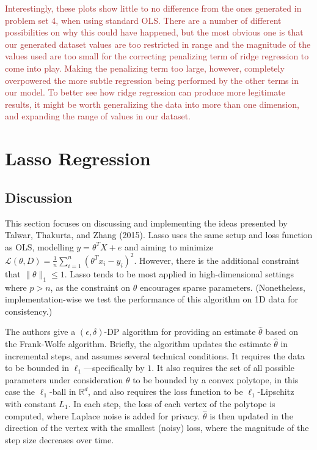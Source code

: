 \documentclass[11pt,conference]{IEEEtran}
\newcommand{\loss}{\mathcal{L}}
\begin{document}
\newpage
\textcolor{brown}{Interestingly, these plots show little to no difference from the ones generated in problem set 4, when using standard OLS. There are a number of different possibilities on why this could have happened, but the most obvious one is that our generated dataset values are too restricted in range and the magnitude of the values used are too small for the correcting penalizing term of ridge regression to come into play. Making the penalizing term too large, however, completely overpowered the more subtle regression being performed by the other terms in our model. To better see how ridge regression can produce more legitimate results, it might be worth generalizing the data into more than one dimension, and expanding the range of values in our dataset.}

\section{Lasso Regression}
\subsection{Discussion}
This section focuses on discussing and implementing the ideas presented by Talwar, Thakurta, and Zhang (2015). Lasso uses the same setup and loss function as OLS, modelling $y=\theta^T X+e$ and aiming to minimize $\loss(\theta, D)=\frac{1}{n}\sum_{i=1}^n (\theta^T x_i-y_i)^2$. However, there is the additional constraint that $\|\theta\|_1\leq 1$. Lasso tends to be most applied in high-dimensional settings where $p>n$, as the constraint on $\theta$ encourages sparse parameters. (Nonetheless, implementation-wise we test the performance of this algorithm on 1D data for consistency.)

The authors give a $(\epsilon,\delta)$-DP algorithm for providing an estimate $\hat{\theta}$ based on the Frank-Wolfe algorithm. Briefly, the algorithm updates the estimate $\hat{\theta}$ in incremental steps, and assumes several technical conditions. It requires the data to be bounded in $\ell_1$---specifically by $1$. It also requires the set of all possible parameters under consideration $\theta$ to be bounded by a convex polytope, in this case the $\ell_1$-ball in $\mathbb{R}^d$, and also requires the loss function to be $\ell_1$-Lipschitz with constant $L_1$. In each step, the loss of each vertex of the polytope is computed, where Laplace noise is added for privacy. $\hat{\theta}$ is then updated in the direction of the vertex with the smallest (noisy) loss, where the magnitude of the step size decreases over time. 
\end{document}
